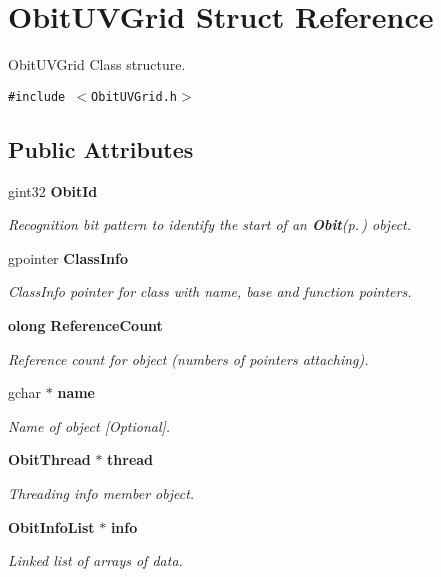 \section{Obit\-UVGrid Struct Reference}
\label{structObitUVGrid}
Obit\-UVGrid Class structure.  


{\tt \#include $<$Obit\-UVGrid.h$>$}

\subsection*{Public Attributes}
\begin{CompactItemize}
\item 
gint32 {\bf Obit\-Id}
\begin{CompactList}\small\item\em Recognition bit pattern to identify the start of an {\bf Obit}{\rm (p.\,\pageref{structObit})} object. \item\end{CompactList}\item 
gpointer {\bf Class\-Info}
\begin{CompactList}\small\item\em Class\-Info pointer for class with name, base and function pointers. \item\end{CompactList}\item 
{\bf olong} {\bf Reference\-Count}
\begin{CompactList}\small\item\em Reference count for object (numbers of pointers attaching). \item\end{CompactList}\item 
gchar $\ast$ {\bf name}
\begin{CompactList}\small\item\em Name of object [Optional]. \item\end{CompactList}\item 
{\bf Obit\-Thread} $\ast$ {\bf thread}
\begin{CompactList}\small\item\em Threading info member object. \item\end{CompactList}\item 
{\bf Obit\-Info\-List} $\ast$ {\bf info}
\begin{CompactList}\small\item\em Linked list of arrays of data. \item\end{CompactList}\item 

\end{CompactItemize}
